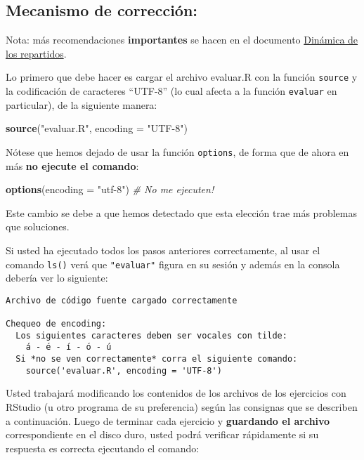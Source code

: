 \documentclass[]{article}
\newenvironment{Shaded}{}{}
\newcommand{\KeywordTok}[1]{\textcolor[rgb]{0.00,0.44,0.13}{\textbf{{#1}}}}
\newcommand{\DataTypeTok}[1]{\textcolor[rgb]{0.56,0.13,0.00}{{#1}}}
\newcommand{\StringTok}[1]{\textcolor[rgb]{0.25,0.44,0.63}{{#1}}}
\newcommand{\CommentTok}[1]{\textcolor[rgb]{0.38,0.63,0.69}{\textit{{#1}}}}
\newcommand{\NormalTok}[1]{{#1}}
\begin{document}
\subsection{Mecanismo de corrección:}

Nota: más recomendaciones \textbf{importantes} se hacen en el documento
\href{http://goo.gl/P5Wnq}{Dinámica de los repartidos}.

Lo primero que debe hacer es cargar el archivo evaluar.R con la función
\texttt{source} y la codificación de caracteres ``UTF-8'' (lo cual
afecta a la función \texttt{evaluar} en particular), de la siguiente
manera:

\begin{Shaded}
\begin{Highlighting}[]
\KeywordTok{source}\NormalTok{(}\StringTok{"evaluar.R"}\NormalTok{, }\DataTypeTok{encoding =} \StringTok{"UTF-8"}\NormalTok{)}
\end{Highlighting}
\end{Shaded}
Nótese que hemos dejado de usar la función \texttt{options}, de forma
que de ahora en más \textbf{no ejecute el comando}:

\begin{Shaded}
\begin{Highlighting}[]
\KeywordTok{options}\NormalTok{(}\DataTypeTok{encoding =} \StringTok{"utf-8"}\NormalTok{)  }\CommentTok{# No me ejecuten!}
\end{Highlighting}
\end{Shaded}
Este cambio se debe a que hemos detectado que esta elección trae más
problemas que soluciones.

Si usted ha ejecutado todos los pasos anteriores correctamente, al usar
el comando \texttt{ls()} verá que \texttt{"evaluar"} figura en su sesión
y además en la consola debería ver lo siguiente:

\begin{verbatim}
Archivo de código fuente cargado correctamente

Chequeo de encoding:
  Los siguientes caracteres deben ser vocales con tilde:
    á - é - í - ó - ú
  Si *no se ven correctamente* corra el siguiente comando:
    source('evaluar.R', encoding = 'UTF-8')
\end{verbatim}
Usted trabajará modificando los contenidos de los archivos de los
ejercicios con RStudio (u otro programa de su preferencia) según las
consignas que se describen a continuación. Luego de terminar cada
ejercicio y \textbf{guardando el archivo} correspondiente en el disco
duro, usted podrá verificar rápidamente si su respuesta es correcta
ejecutando el comando:
\end{document}

